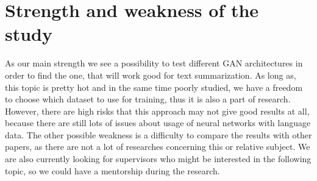 \documentclass[sigplan]{acmart}
\begin{document}
\section{Strength and weakness of the study}
As our main strength we see a possibility to test different GAN architectures in order to find the one, that will work good for text summarization. As long as, this topic is pretty hot and in the same time poorly studied, we have a freedom to choose which dataset to use for training, thus it is also a part of research. 
However, there are high risks that this approach may not give good results at all, because there are still lots of issues about  usage of neural networks with language data. The other possible weakness is a difficulty to compare the results with other papers, as there are not a lot of researches concerning this or relative subject. 
We are also currently looking for supervisors who might be interested in the following topic, so we could have a mentorship during the research.



\end{document}
